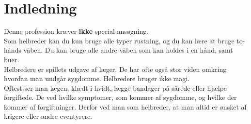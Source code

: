 
\chapter*{Indledning}

Denne profession kræver \textbf{ikke} special ansøgning.\\
Som helbreder kan du kun bruge alle typer rustning, og du kan lære at bruge to-hånds våben. Du kan bruge alle andre våben som kan holdes i en hånd, samt buer.\\

Helbredere er spillets udgave af læger. De har ofte også stor viden omkring hvordan man undgår sygdomme. Helbredere bruger ikke magi.\\ Oftest ser man lægen, klædt i hvidt,  lægge bandager på sårede eller hjælpe forgiftede. De ved hvilke symptomer, som kommer af sygdomme, og hvilke der kommer af forgiftninger. Derfor ved man som helbreder, at man altid er ønsket af krigere eller andre eventyrere.

